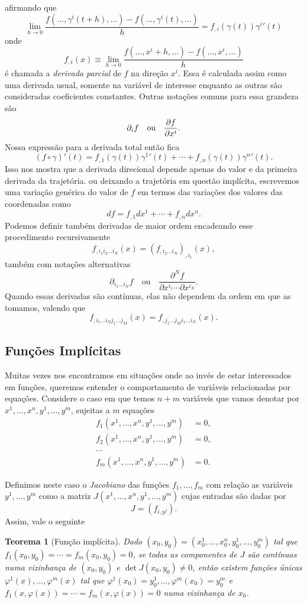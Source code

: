\documentclass[a4paper, 12pt]{article}
\newcommand{\pd}[3]{\ifblank{#3}{}{\left(}\frac{\partial #1}{\partial #2}\ifblank{#3}{}{\right)_{#3}}}
\newtheorem{theorem}{Teorema}[section]
\theoremstyle{definition}
\theoremstyle{definition}
\begin{document}
afirmando que
$$\lim\limits_{h\rightarrow0}\frac{f(\dots,\gamma^i(t+h),\dots)
-f(\dots,\gamma^i(t),\dots)}{h}=f_{,i}(\gamma(t))\gamma^i{'}(t)$$
onde
$$f_{,i}(x)\equiv\lim\limits_{h\rightarrow0}\frac{f(\dots,x^i+h,\dots)-f(\dots,x^i,\dots)}{h}$$
é chamada a \textit{derivada parcial} de $f$ na direção $x^i$. Essa é calculada assim como uma derivada
usual, somente na variável de interesse enquanto as outras são consideradas coeficientes constantes.
Outras notações comuns para essa grandeza são
$$\partial_i f\quad\text{ou}\quad\pd{f}{x^i}{}.$$
Nossa expressão para a derivada total então fica
$$(f\circ\gamma)'(t)=f_{,1}(\gamma(t))\gamma^{1}{'}(t)+\cdots+f_{,n}(\gamma(t))\gamma^{n}{'}(t).$$
Isso nos mostra que a derivada direcional depende apenas do valor e da primeira derivada da trajetória.
ou deixando a trajetória em questão implícita, escrevemos uma variação genérica do valor de $f$ em termos
das variações dos valores das coordenadas como
$$df=f_{,1}dx^1+\cdots+f_{,n}dx^n.$$
Podemos definir também derivadas de maior ordem encadeando esse procedimento recursivamente
$$f_{,i_1i_2\dots i_N}(x)=(f_{,i_2\dots i_N})_{,i_1}(x),$$
também com notações alternativas
$$\partial_{i_1\dots i_N} f\quad\text{ou}\quad\frac{\partial^N f}{\partial x^{i_1}\cdots\partial x^{i_N}}.$$
Quando essas derivadas são contínuas, elas não dependem da ordem em que as tomamos, valendo que
$$f_{,i_1\dots i_Nj_1\dots j_M}(x)=f_{,j_1\dots j_Mi_1\dots i_N}(x).$$

\subsection{Funções Implícitas}

Muitas vezes nos encontramos em situações onde ao invés de estar interessados em funções, queremos entender
o comportamento de variáveis relacionadas por equações. Considere o caso em que temos $n+m$ variáveis
que vamos denotar por $x^1,\dots,x^n,y^1,\dots,y^m$, sujeitas a $m$ equações
\begin{align*}
    f_1(x^1,\dots,x^n,y^1,\dots,y^m)&=0,\\
    f_2(x^1,\dots,x^n,y^1,\dots,y^m)&=0,\\
    \cdots&\\
    f_m(x^1,\dots,x^n,y^1,\dots,y^m)&=0.
\end{align*}

Definimos neste caso o \textit{Jacobiano} das funções $f_1,\dots,f_m$ com relação as variáveis $y^1,\dots,y^m$
como a matriz $J(x^1,\dots,x^n,y^1,\dots,y^m)$ cujas entradas são dadas por
$$J=\left(f_{i,y^j}\right).$$
Assim, vale o seguinte 
\begin{theorem}[Função implícita]
    Dado $(x_0,y_0)=(x^1_0,\dots,x^n_0,y^1_0,\dots,y^m_0)$ tal que $f_1(x_0,y_0)=\cdots=f_m(x_0,y_0)=0$,
    se todas as componentes de $J$ são contínuas numa vizinhança de $(x_0,y_0)$ e $\det J(x_0,y_0)\neq0$,
    então existem funções únicas $\varphi^1(x),\dots,\varphi^m(x)$ tal que $\varphi^1(x_0)=y^1_0,\dots,
    \varphi^m(x_0)=y^m_0$ e $f_1(x,\varphi(x))=\cdots=f_m(x,\varphi(x))=0$ numa vizinhança de $x_0$.
\end{theorem}
\end{document}
